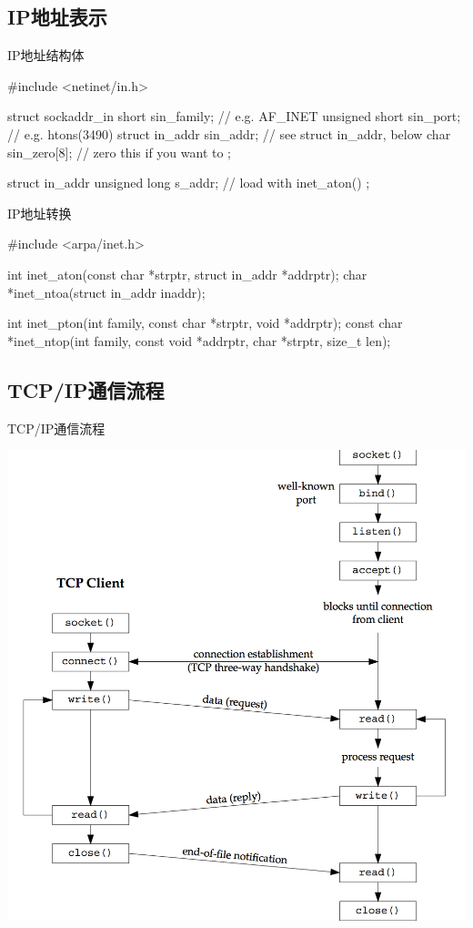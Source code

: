 \documentclass[UTF8]{beamer}
\begin{document}
\subsection{IP地址表示}
\begin{frame}[fragile]{IP地址结构体}
  \begin{ccode}
    #include <netinet/in.h>

    struct sockaddr_in {
      short          sin_family;  // e.g. AF_INET
      unsigned short sin_port;    // e.g. htons(3490)
      struct in_addr sin_addr;    // see struct in_addr, below
      char           sin_zero[8]; // zero this if you want to
    };

    struct in_addr {
      unsigned long s_addr;  // load with inet_aton()
    };
  \end{ccode}
\end{frame}
\begin{frame}[fragile]{IP地址转换}
  \begin{ccode}
    #include <arpa/inet.h>

    int inet_aton(const char *strptr, struct in_addr *addrptr);
    char *inet_ntoa(struct in_addr inaddr);

    int inet_pton(int family, const char *strptr, void *addrptr);
    const char *inet_ntop(int family, const void *addrptr, char *strptr, size_t len);
  \end{ccode}
\end{frame}
\subsection{TCP/IP通信流程}
\begin{frame}{TCP/IP通信流程}
  \centerline{\includegraphics[height=\textheight]{img/tcp.png}}
\end{frame}
\end{document}
